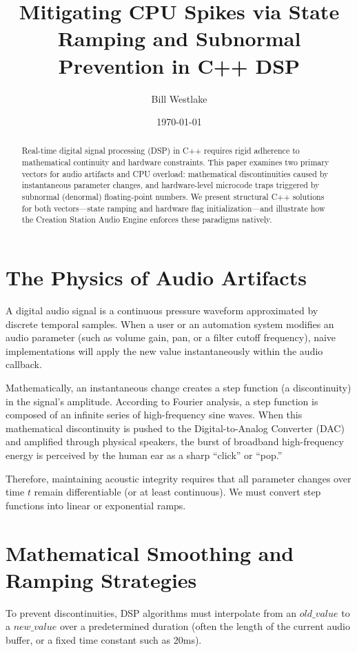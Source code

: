 \documentclass[11pt,a4paper]{article}
\title{Mitigating CPU Spikes via State Ramping and Subnormal Prevention in C++ DSP}
\author{Bill Westlake}
\date{\today}
\begin{document}
\maketitle

\begin{abstract}
Real-time digital signal processing (DSP) in C++ requires rigid adherence to mathematical continuity and hardware constraints. This paper examines two primary vectors for audio artifacts and CPU overload: mathematical discontinuities caused by instantaneous parameter changes, and hardware-level microcode traps triggered by subnormal (denormal) floating-point numbers. We present structural C++ solutions for both vectors---state ramping and hardware flag initialization---and illustrate how the Creation Station Audio Engine enforces these paradigms natively.
\end{abstract}

\section{The Physics of Audio Artifacts}
A digital audio signal is a continuous pressure waveform approximated by discrete temporal samples. When a user or an automation system modifies an audio parameter (such as volume gain, pan, or a filter cutoff frequency), naive implementations will apply the new value instantaneously within the audio callback. 

Mathematically, an instantaneous change creates a step function (a discontinuity) in the signal's amplitude. According to Fourier analysis, a step function is composed of an infinite series of high-frequency sine waves. When this mathematical discontinuity is pushed to the Digital-to-Analog Converter (DAC) and amplified through physical speakers, the burst of broadband high-frequency energy is perceived by the human ear as a sharp ``click'' or ``pop.''

Therefore, maintaining acoustic integrity requires that all parameter changes over time $t$ remain differentiable (or at least continuous). We must convert step functions into linear or exponential ramps.

\section{Mathematical Smoothing and Ramping Strategies}
To prevent discontinuities, DSP algorithms must interpolate from an $old\_value$ to a $new\_value$ over a predetermined duration (often the length of the current audio buffer, or a fixed time constant such as 20ms). 
\end{document}
